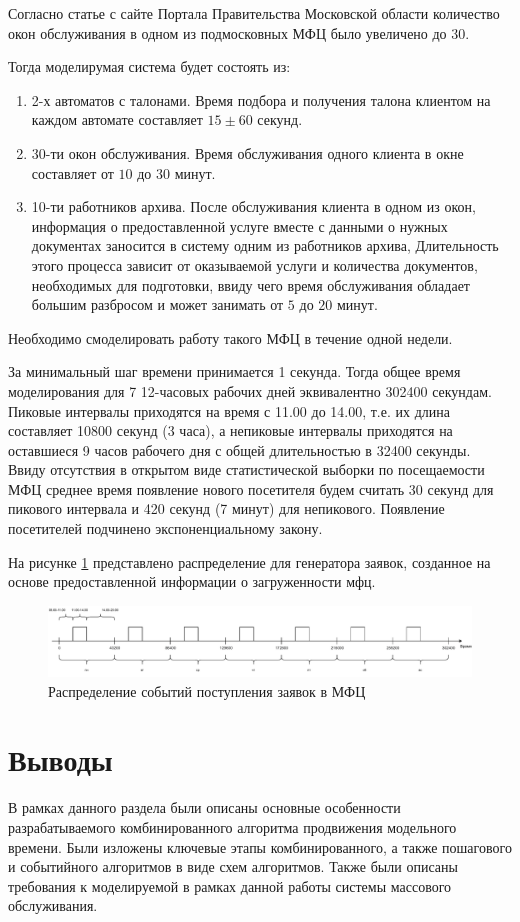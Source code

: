 Согласно статье с сайте Портала Правительства Московской области \cite{mosreg_ru} количество окон обслуживания в одном из подмосковных МФЦ было увеличено до 30.

Тогда моделирумая система будет состоять из:
\begin{enumerate}
	\item 2-х автоматов с талонами. Время подбора и получения талона клиентом на каждом автомате составляет $15\pm60$ секунд.
	\item 30-ти окон обслуживания. Время обслуживания одного клиента в окне составляет от $10$  до $30$ минут.
	\item 10-ти работников архива. После обслуживания клиента в одном из окон, информация о предоставленной услуге вместе с данными о нужных документах заносится в систему одним из работников архива, Длительность этого процесса зависит от оказываемой услуги и количества документов, необходимых для подготовки, ввиду чего время обслуживания обладает большим разбросом и может занимать от $5$ до $20$ минут.
\end{enumerate}

Необходимо смоделировать работу такого МФЦ в течение одной недели.


За минимальный шаг времени принимается 1 секунда. Тогда общее время моделирования для 7 12-часовых рабочих дней эквивалентно 302400 секундам. Пиковые интервалы приходятся на время с 11.00 до 14.00, т.е. их длина составляет 10800 секунд (3 часа), а непиковые интервалы приходятся на оставшиеся 9 часов рабочего дня с общей длительностью в 32400 секунды. Ввиду отсутствия в открытом виде статистической выборки по посещаемости МФЦ среднее время появление нового посетителя будем считать 30 секунд для пикового интервала и 420 секунд (7 минут) для непикового. Появление посетителей подчинено экспоненциальному закону.

На рисунке \ref{img:system_modelling_distr}	 представлено распределение для генератора заявок, созданное на основе предоставленной информации о загруженности мфц.

\begin{figure}[h!btp]
	\centering
	\includegraphics[width=0.9\columnwidth]{inc/img/system_modelling_distr.pdf}
	\caption{Распределение событий поступления заявок в МФЦ}
	\label{img:system_modelling_distr}	
\end{figure}
	
\section{Выводы}
В рамках данного раздела были описаны основные особенности разрабатываемого комбинированного алгоритма продвижения модельного времени. Были изложены ключевые этапы комбинированного, а также пошагового и событийного алгоритмов в виде схем алгоритмов. Также были описаны требования к моделируемой в рамках данной работы системы массового обслуживания.
